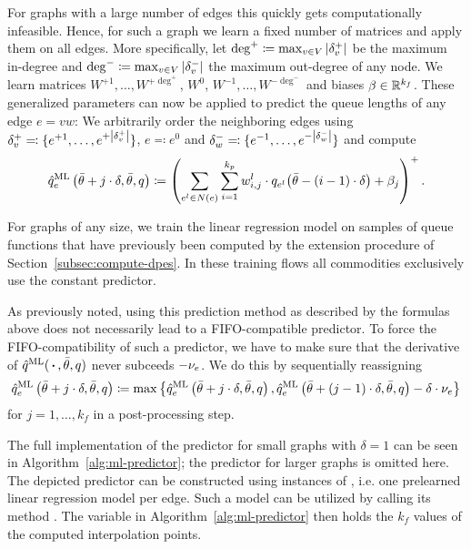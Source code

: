 For graphs with a large number of edges this quickly gets computationally infeasible. Hence, for such a graph we learn a fixed number of matrices and apply them on all edges.
More specifically, let $\deg^+\coloneqq \max_{v\in V} \left|  \delta^+_{v}  \right|$ be the maximum in-degree and $\deg^-\coloneqq \max_{v\in V} \left| \delta^-_{v} \right|$ the maximum out-degree of any node.
We learn matrices $W^{+1},\dots,W^{+\deg^+}$, $W^0$, $W^{-1},\dots,W^{-\deg^-}$ and biases $\beta\in\mathbb{R}^{k_f}$.
These generalized parameters can now be applied to predict the queue lengths of any edge $e=vw$:
We arbitrarily order the neighboring edges using $\delta^+_{v} \eqqcolon \{ e^{+1},\dots,e^{+\left| \delta^+_{v} \right|}\}$, $e\eqqcolon e^0$ and $\delta^-_{w} \eqqcolon \{ e^{-1},\dots,e^{-\left| \delta^-_{w} \right|} \}$ and compute \[
  \hat q^{\text{ML}}_e\left(\bar\theta + j\cdot\delta,\bar\theta,q \right) \coloneqq 
  \left(
  \sum_{e^l\in N(e)} \sum_{i = 1}^{k_p} w^{l}_{i, j} \cdot {q_{e^l}}{\left( 
      \bar\theta - (i-1)\cdot\delta
  \right)}
  + \beta_j
  \right)^+.
\]
 
For graphs of any size, we train the linear regression model on samples of queue functions that have previously been computed by the extension procedure of Section~\ref{subsec:compute-dpes}.
In these training flows all commodities exclusively use the constant predictor.

As previously noted, using this prediction method as described by the formulas above does not necessarily lead to a FIFO-compatible predictor.
To force the FIFO-compati\-bility of such a predictor, we have to make sure that the derivative of $\hat q^{\text{ML}}(\,\boldsymbol{\cdot}\,,\bar\theta,q)$ never subceeds $-\nu_e$.
We do this by sequentially reassigning \[
  \hat q^{\text{ML}}_e\left(\bar\theta + j\cdot\delta,\bar\theta,q \right)
  \coloneqq \max\left\{
    \hat q^{\text{ML}}_e\left(\bar\theta + j\cdot\delta,\bar\theta,q \right), \hat q^{\text{ML}}_e\left(\bar\theta + (j-1)\cdot\delta,\bar\theta,q \right) - \delta\cdot \nu_e
    \right\}
  \]
for $j=1,\dots,k_f$ in a post-processing step.

The full implementation of the predictor for small graphs with $\delta = 1$ can be seen in Algorithm~\ref{alg:ml-predictor}; the predictor for larger graphs is omitted here.
The depicted predictor can be constructed using instances of , i.e. one prelearned linear regression model per edge.
Such a model can be utilized by calling its method .
The variable  in Algorithm~\ref{alg:ml-predictor} then holds the $k_f$ values of the computed interpolation points. 

